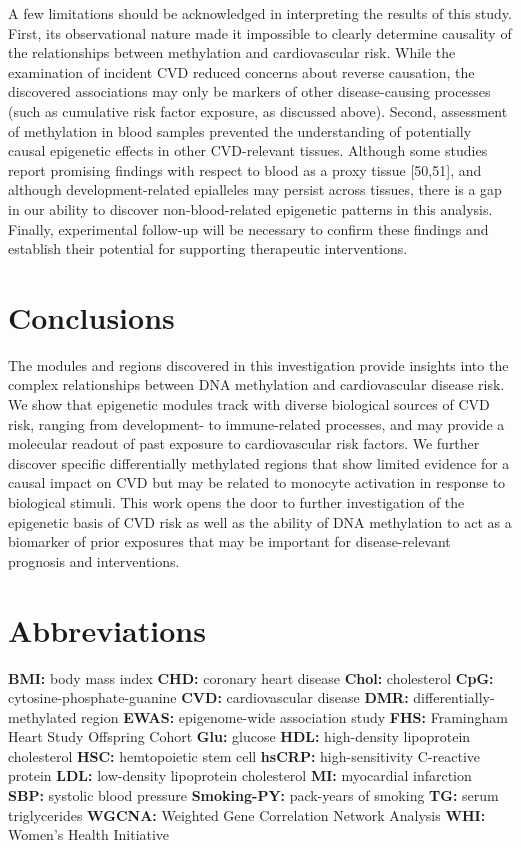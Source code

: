 \documentclass[]{bmcart}
\begin{document}
A few limitations should be acknowledged in interpreting the results of
this study. First, its observational nature made it impossible to
clearly determine causality of the relationships between methylation and
cardiovascular risk. While the examination of incident CVD reduced
concerns about reverse causation, the discovered associations may only
be markers of other disease-causing processes (such as cumulative risk
factor exposure, as discussed above). Second, assessment of methylation
in blood samples prevented the understanding of potentially causal
epigenetic effects in other CVD-relevant tissues. Although some studies
report promising findings with respect to blood as a proxy tissue
{[}50,51{]}, and although development-related epialleles may persist
across tissues, there is a gap in our ability to discover
non-blood-related epigenetic patterns in this analysis. Finally,
experimental follow-up will be necessary to confirm these findings and
establish their potential for supporting therapeutic interventions.

\section{Conclusions}\label{conclusions}

The modules and regions discovered in this investigation provide
insights into the complex relationships between DNA methylation and
cardiovascular disease risk. We show that epigenetic modules track with
diverse biological sources of CVD risk, ranging from development- to
immune-related processes, and may provide a molecular readout of past
exposure to cardiovascular risk factors. We further discover specific
differentially methylated regions that show limited evidence for a
causal impact on CVD but may be related to monocyte activation in
response to biological stimuli. This work opens the door to further
investigation of the epigenetic basis of CVD risk as well as the ability
of DNA methylation to act as a biomarker of prior exposures that may be
important for disease-relevant prognosis and interventions.

\section{Abbreviations}\label{abbreviations}

\textbf{BMI:} body mass index
\textbf{CHD:} coronary heart disease
\textbf{Chol:} cholesterol
\textbf{CpG:} cytosine-phosphate-guanine
\textbf{CVD:} cardiovascular disease
\textbf{DMR:} differentially-methylated region
\textbf{EWAS:} epigenome-wide association study
\textbf{FHS:} Framingham Heart Study Offspring Cohort
\textbf{Glu:} glucose
\textbf{HDL:} high-density lipoprotein cholesterol
\textbf{HSC:} hemtopoietic stem cell
\textbf{hsCRP:} high-sensitivity C-reactive protein
\textbf{LDL:} low-density lipoprotein cholesterol
\textbf{MI:} myocardial infarction
\textbf{SBP:} systolic blood pressure
\textbf{Smoking-PY:} pack-years of smoking 
\textbf{TG:} serum triglycerides
\textbf{WGCNA:} Weighted Gene Correlation Network Analysis
\textbf{WHI:} Women's Health Initiative
\end{document}
